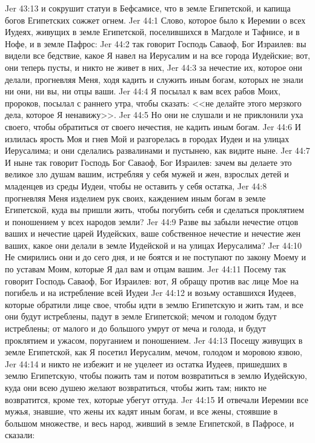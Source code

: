 \vs Jer 43:13 и сокрушит статуи в Бефсамисе, что в земле Египетской, и капища богов Египетских сожжет огнем.
\vs Jer 44:1 Слово, которое было к Иеремии о всех Иудеях, живущих в земле Египетской, поселившихся в Магдоле и Тафнисе, и в Нофе, и в земле Пафрос:
\vs Jer 44:2 так говорит Господь Саваоф, Бог Израилев: вы видели все бедствие, какое Я навел на Иерусалим и на все города Иудейские; вот, они теперь пусты, и никто не живет в них,
\vs Jer 44:3 за нечестие их, которое они делали, прогневляя Меня, ходя кадить и служить иным богам, которых не знали ни они, ни вы, ни отцы ваши.
\vs Jer 44:4 Я посылал к вам всех рабов Моих, пророков, посылал с раннего утра, чтобы сказать: <<не делайте этого мерзкого дела, которое Я ненавижу>>.
\vs Jer 44:5 Но они не слушали и не приклонили уха своего, чтобы обратиться от своего нечестия, не кадить иным богам.
\vs Jer 44:6 И излилась ярость Моя и гнев Мой и разгорелась в городах Иудеи и на улицах Иерусалима; и они сделались развалинами и пустынею, как видите ныне.
\vs Jer 44:7 И ныне так говорит Господь Бог Саваоф, Бог Израилев: зачем вы делаете это великое зло душам вашим, истребляя у себя мужей и жен, взрослых детей и младенцев из среды Иудеи, чтобы не оставить у себя остатка,
\vs Jer 44:8 прогневляя Меня изделием рук своих, каждением иным богам в земле Египетской, куда вы пришли жить, чтобы погубить себя и сделаться проклятием и поношением у всех народов земли?
\vs Jer 44:9 Разве вы забыли нечестие отцов ваших и нечестие царей Иудейских, ваше собственное нечестие и нечестие жен ваших, какое они делали в земле Иудейской и на улицах Иерусалима?
\vs Jer 44:10 Не смирились они и до сего дня, и не боятся и не поступают по закону Моему и по уставам Моим, которые Я дал вам и отцам вашим.
\vs Jer 44:11 Посему так говорит Господь Саваоф, Бог Израилев: вот, Я обращу против вас лице Мое на погибель и на истребление всей Иудеи
\vs Jer 44:12 и возьму оставшихся Иудеев, которые обратили лице свое, чтобы идти в землю Египетскую и жить там, и все они будут истреблены, падут в земле Египетской; мечом и голодом будут истреблены; от малого и до большого умрут от меча и голода, и будут проклятием и ужасом, поруганием и поношением.
\vs Jer 44:13 Посещу живущих в земле Египетской, как Я посетил Иерусалим, мечом, голодом и моровою язвою,
\vs Jer 44:14 и никто не избежит и не уцелеет из остатка Иудеев, пришедших в землю Египетскую, чтобы пожить там и потом возвратиться в землю Иудейскую, куда они всею душею желают возвратиться, чтобы жить там; никто не возвратится, кроме тех, которые убегут оттуда.
\rsbpar\vs Jer 44:15 И отвечали Иеремии все мужья, знавшие, что жены их кадят иным богам, и все жены, стоявшие  в большом множестве, и весь народ, живший в земле Египетской, в Пафросе, и сказали:
